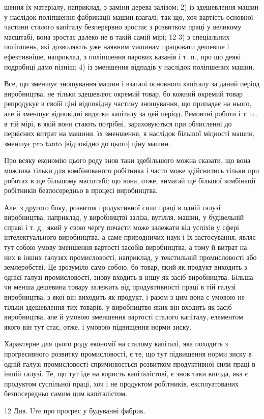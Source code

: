 шення їх матеріалу, наприклад, з заміни дерева залізом; 2) із
здешевлення машин у наслідок поліпшення фабрикації машин
взагалі; так що, хоч вартість основної частини сталого капіталу
безперервно зростає з розвитком праці у великому масштабі,
вона зростає далеко не в такій самій мірі; 12 3) з спеціальних поліпшень,
які дозволяють уже наявним машинам працювати дешевше
і ефективніше, наприклад, з поліпшення парових казанів
і т. п., про що деякі подробиці дамо пізніш; 4) із зменшення
відпадів у наслідок поліпшених машин.

Все, що зменшує зношування машин і взагалі основного капіталу
за даний період виробництва, не тільки здешевлює окремий
товар, бо кожний окремий товар репродукує в своїй ціні
відповідну частину зношування, що припадає на нього, але
й зменшує відповідні видатки капіталу за цей період. Ремонтні
роботи і т. п., в тій мірі, в якій вони стають потрібні, зараховуються
при обчисленні до первісних витрат на машини. їх зменшення,
в наслідок більшої міцності машин, зменшує pro tanto
[відповідно до цього] ціну машин.

Про всяку економію цього роду знов таки здебільшого можна
сказати, що вона можлива тільки для комбінованого робітника
і часто може здійснитись тільки при роботах в ще більшому
масштабі; що вона, отже, вимагай ще більшої комбінації робітників
безпосередньо в процесі виробництва.

Але, з другого боку, розвиток продуктивної сили праці
в одній галузі виробництва, наприклад, у виробництві заліза,
вугілля, машин, у будівельній справі і т. д., який у свою чергу
почасти може залежати від успіхів у сфері інтелектуального
виробництва, а саме природничих наук і їх застосування, являє
тут собою умову зменшення вартості засобів виробництва, а тому
й витрат на них в інших галузях промисловості, наприклад,
у текстильній промисловості або землеробстві. Це зрозуміло
само собою, бо товар, який як продукт виходить з однієї галузі
промисловості, знову входить в іншу як засіб виробництва.
Більша чи менша дешевина товару залежить від продуктивності
праці в тій галузі виробництва, з якої він виходить як продукт,
і разом з цим вона є умовою не тільки здешевлення тих товарів,
у виробництво яких він входить як засіб виробництва, але
й умовою зменшення вартості сталого капіталу, елементом якого
він тут стає, отже, і умовою підвищення норми зиску.

Характерне для цього роду економії на сталому капіталі,
яка походить з прогресивного розвитку промисловості, є те,
що тут підвищення норми зиску в одній галузі промисловості
спричинюється розвитком продуктивної сили праці в іншій галузі.
Те, що тут іде на користь капіталістові, є знов таки вигода,
яка є продуктом суспільної праці, хоч і не продуктом робітників,
експлуатованих безпосередньо самим цим капіталістом.

12 Див. Ure про прогрес у будуванні фабрик.
